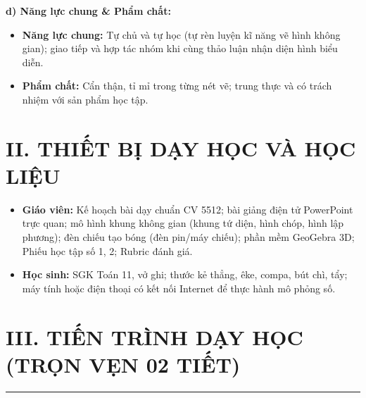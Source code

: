 \documentclass[12pt, a4paper]{article}
\begin{document}
\textbf{d) Năng lực chung \& Phẩm chất:}
\begin{itemize}[leftmargin=1.5em]
    \item \textbf{Năng lực chung:} Tự chủ và tự học (tự rèn luyện kĩ năng vẽ hình không gian); giao tiếp và hợp tác nhóm khi cùng thảo luận nhận diện hình biểu diễn.
    \item \textbf{Phẩm chất:} Cẩn thận, tỉ mỉ trong từng nét vẽ; trung thực và có trách nhiệm với sản phẩm học tập.
\end{itemize}

\section*{II. THIẾT BỊ DẠY HỌC VÀ HỌC LIỆU}
\begin{itemize}[leftmargin=1.5em]
    \item \textbf{Giáo viên:} Kế hoạch bài dạy chuẩn CV 5512; bài giảng điện tử PowerPoint trực quan; mô hình khung không gian (khung tứ diện, hình chóp, hình lập phương); đèn chiếu tạo bóng (đèn pin/máy chiếu); phần mềm GeoGebra 3D; Phiếu học tập số 1, 2; Rubric đánh giá.
    \item \textbf{Học sinh:} SGK Toán 11, vở ghi; thước kẻ thẳng, êke, compa, bút chì, tẩy; máy tính hoặc điện thoại có kết nối Internet để thực hành mô phỏng số.
\end{itemize}

\section*{III. TIẾN TRÌNH DẠY HỌC (TRỌN VẸN 02 TIẾT)}

\begin{center}
\end{center}

\vspace{0.8em}
\hrule
\vspace{0.8em}
\end{document}
